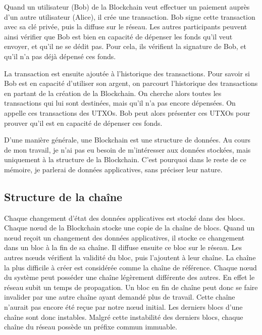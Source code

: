     Quand un utilisateur (Bob) de la Blockchain veut effectuer un paiement
    auprès d'un autre utilisateur (Alice), il crée une transaction. Bob signe
    cette transaction avec sa clé privée, puis la diffuse sur le réseau. Les
    autres participants peuvent ainsi vérifier que Bob est bien en capacité de
    dépenser les fonds qu'il veut envoyer, et qu'il ne se dédit pas. Pour cela,
    ils vérifient la signature de Bob, et qu'il n'a pas déjà dépensé ces fonds.
     
    La transaction est ensuite ajoutée à l'historique des transactions. Pour
    savoir si Bob est en capacité d'utiliser son argent, on parcourt
    l'historique des transactions en partant de la création de la Blockchain. On
    cherche alors toutes les transactions qui lui sont destinées, mais qu'il n'a
    pas encore dépensées. On appelle ces transactions des UTXOs. Bob peut alors
    présenter ces UTXOs pour prouver qu'il est en capacité de dépenser ces
    fonds.

    D'une manière générale, une Blockchain est une structure de données. Au
    cours de mon travail, je n'ai pas eu besoin de m'intéresser aux données
    stockées, mais uniquement à la structure de la Blockchain. C'est pourquoi
    dans le reste de ce mémoire, je parlerai de données applicatives, sans
    préciser leur nature.


    \subsection{Structure de la chaîne}\label{subsec:fonctionnement}
    
    Chaque changement d'état des données applicatives est stocké dans des blocs.
    Chaque nœud de la Blockchain stocke une copie de la chaîne de blocs. Quand
    un nœud reçoit un changement des données applicatives, il stocke ce
    changement dans un bloc à la fin de sa chaîne. Il diffuse ensuite ce bloc
    sur le réseau. Les autres nœuds vérifient la validité du bloc, puis
    l'ajoutent à leur chaîne. La chaîne la plus difficile à créer est considérée
    comme la chaîne de référence. Chaque nœud du système peut posséder une
    chaîne légèrement différente des autres. En effet le réseau subit un temps
    de propagation. Un bloc en fin de chaîne peut donc se faire invalider par
    une autre chaîne ayant demandé plus de travail. Cette chaîne n'aurait pas
    encore été reçue par notre nœud initial. Les derniers blocs d'une chaîne
    sont donc instables. Malgré cette instabilité des derniers blocs, chaque
    chaîne du réseau possède un préfixe commun immuable.

